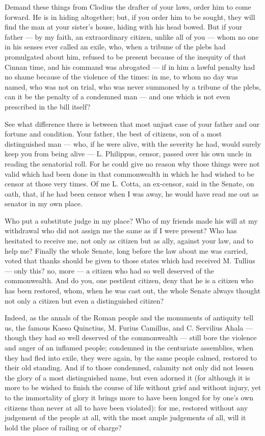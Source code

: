  Demand these things from Clodius the drafter of your laws, order him to come forward. He is in hiding altogether; but, if you order him to be sought, they will find the man at your sister's house, hiding with his head bowed. But if your father --- by my faith, an extraordinary citizen, unlike all of you --- whom no one in his senses ever called an exile, who, when a tribune of the plebs had promulgated about him, refused to be present because of the inequity of that Cinnan time, and his command was abrogated --- if in him a lawful penalty had no shame because of the violence of the times: in me, to whom no day was named, who was not on trial, who was never summoned by a tribune of the plebs, can it be the penalty of a condemned man --- and one which is not even prescribed in the bill itself?

 See what difference there is between that most unjust case of your father and our fortune and condition. Your father, the best of citizens, son of a most distinguished man --- who, if he were alive, with the severity he had, would surely keep you from being alive --- L. Philippus, censor, passed over his own uncle in reading the senatorial roll. For he could give no reason why those things were not valid which had been done in that commonwealth in which he had wished to be censor at those very times. Of me L. Cotta, an ex-censor, said in the Senate, on oath, that, if he had been censor when I was away, he would have read me out as senator in my own place.

 Who put a substitute judge in my place? Who of my friends made his will at my withdrawal who did not assign me the same as if I were present? Who has hesitated to receive me, not only as citizen but as ally, against your law, and to help me? Finally the whole Senate, long before the law about me was carried, voted that thanks should be given to those states which had received M. Tullius --- only this? no, more --- a citizen who had so well deserved of the commonwealth. And do you, one pestilent citizen, deny that he is a citizen who has been restored, whom, when he was cast out, the whole Senate always thought not only a citizen but even a distinguished citizen?

 Indeed, as the annals of the Roman people and the monuments of antiquity tell us, the famous Kaeso Quinctius, M. Furius Camillus, and C. Servilius Ahala --- though they had so well deserved of the commonwealth --- still bore the violence and anger of an inflamed people; condemned in the centuriate assemblies, when they had fled into exile, they were again, by the same people calmed, restored to their old standing. And if to those condemned, calamity not only did not lessen the glory of a most distinguished name, but even adorned it (for although it is more to be wished to finish the course of life without grief and without injury, yet to the immortality of glory it brings more to have been longed for by one's own citizens than never at all to have been violated): for me, restored without any judgement of the people at all, with the most ample judgements of all, will it hold the place of railing or of charge?

